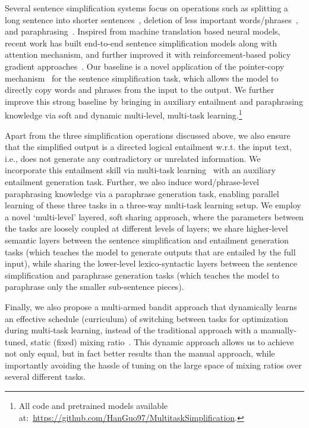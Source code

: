 \documentclass[11pt]{article}
\begin{document}
Several sentence simplification systems focus on operations such as splitting a long sentence into shorter sentences~\cite{SIDDHARTHAN2006SyntacticSA,petersen2007text}, deletion of less important words/phrases~\cite{knight2002summarization,clarke2006models,filippova2008dependency}, and paraphrasing~\cite{devlin1999simplifying,inui2003text,kaji2002verb}. Inspired from machine translation based neural models, recent work has built end-to-end sentence simplification models along with attention mechanism, and further improved it with reinforcement-based policy gradient approaches~\cite{zhang2017dress}. Our baseline is a novel application of the pointer-copy mechanism~\cite{see2017get} for the sentence simplification task, which allows the model to directly copy words and phrases from the input to the output. We  further improve this strong baseline by bringing in auxiliary entailment and paraphrasing knowledge via soft and dynamic multi-level, multi-task learning.\footnote{All code and pretrained models available at:~\url{https://github.com/HanGuo97/MultitaskSimplification}.} 

Apart from the three simplification operations discussed above, we also ensure that the simplified output is a directed logical entailment w.r.t. the input text, i.e., does not generate any contradictory or unrelated information. We incorporate this entailment skill via multi-task learning~\cite{luong2015multi} with an auxiliary entailment generation task. 
Further, we also induce word/phrase-level paraphrasing knowledge via a paraphrase generation task, enabling parallel learning of these three tasks in a three-way multi-task learning setup. 
We employ a novel `multi-level' layered, soft sharing approach, where the parameters between the tasks are loosely coupled at different levels of layers; we share higher-level semantic layers between the sentence simplification and entailment generation tasks (which teaches the model to generate outputs that are entailed by the full input), while sharing the lower-level lexico-syntactic layers between the sentence simplification and paraphrase generation tasks (which teaches the model to paraphrase only the smaller sub-sentence pieces). 

Finally, we also propose a multi-armed bandit approach that dynamically learns an effective schedule (curriculum) of switching between tasks for optimization during multi-task learning, instead of the traditional approach with a manually-tuned, static (fixed) mixing ratio~\cite{luong2015multi}. This dynamic approach allows us to achieve not only  equal, but in fact better results than the manual approach, while importantly avoiding the hassle of tuning on the large space of mixing ratios over several different tasks.
\end{document}
